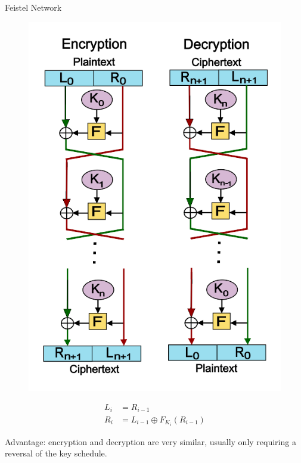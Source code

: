 \documentclass[12pt]{beamer}
\begin{document}
\begin{frame}{Feistel Network}
	\centering
	\begin{minipage}{0.45\textwidth}
		\begin{figure}[h!]
			\centering
			\includegraphics[width=\textwidth,height=0.8\textheight,keepaspectratio]{feistel-structure}
		\end{figure}
	\end{minipage}
	\begin{minipage}{0.45\textwidth}
		\begin{align*}
			L_i &= R_{i-1} \\
			R_i &= L_{i-1} \oplus F_{K_i}(R_{i-1})
		\end{align*}

		Advantage: encryption and decryption are very similar,
		usually only requiring a reversal of the key schedule.
	\end{minipage}

\end{frame}
\end{document}
